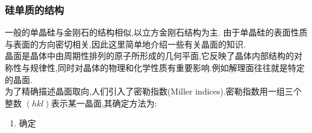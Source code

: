 \documentclass{ctexart}
\begin{document}
\subsubsection{硅单质的结构}
一般的单晶硅与金刚石的结构相似,以立方金刚石结构为主.
由于单晶硅的表面性质与表面的方向密切相关,因此这里简单地介绍一些有关晶面的知识.\\
\indent 晶面是晶体中由周期性排列的原子所形成的几何平面,它反映了晶体内部结构的对称性与规律性,同时对晶体的物理和化学性质有重要影响.例如解理面往往就是特定的晶面.\\
\indent 为了精确描述晶面取向,人们引入了密勒指数(Miller indices).密勒指数用一组三个整数 
$(hkl)$表示某一晶面,其确定方法为:
\begin{enumerate}[label=$\mathit{Step\ \arabic*.}$,topsep=0pt,parsep=0pt,itemsep=0pt,partopsep=0pt,leftmargin=*]
    \item 确定
\end{enumerate}
\end{document}
